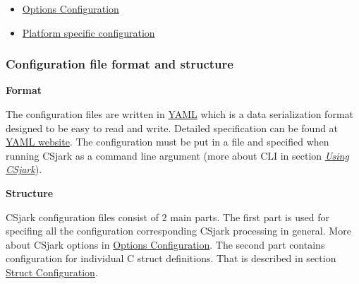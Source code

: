 \documentclass[A4paper,10pt,english]{sphinxmanual}
\begin{document}
{\begin{minipage}{0.95\linewidth}
\begin{itemize}
\begin{itemize}
\begin{itemize}
\begin{itemize}
\end{itemize}

\item {} 
{\hyperref[user/config:trailers]{Trailers}}

\item {} 
{\hyperref[user/config:custom-handling-of-data-types]{Custom handling of data types}}

\item {} 
{\hyperref[user/config:unknown-structs-handling]{Unknown structs handling}}

\end{itemize}

\item {} 
{\hyperref[user/config:options-configuration]{Options Configuration}}

\item {} 
{\hyperref[user/config:platform-specific-configuration]{Platform specific configuration}}

\end{itemize}

\end{itemize}
\end{minipage}}
\begin{center}\setlength{\fboxsep}{5pt}\end{center}


\subsubsection{Configuration file format and structure}
\label{user/config:configuration-file-format-and-structure}
\textbf{Format}

The configuration files are written in \href{http://www.yaml.org/}{YAML} which is a data serialization format designed to be easy to read and write. Detailed specification can be found at \href{http://www.yaml.org/spec/1.2/spec.html}{YAML website}. The configuration must be put in a  file and specified when running CSjark as a command line argument (more about CLI in section {\hyperref[user/use:use]{\emph{Using CSjark}}}).

\textbf{Structure}

CSjark configuration files consist of 2 main parts. The first part is used for specifing all the configuration corresponding CSjark processing in general. More about CSjark options in {\hyperref[user/config:options-configuration]{Options Configuration}}. The second part contains configuration for individual C struct definitions. That is described in section {\hyperref[user/config:struct-configuration]{Struct Configuration}}.
\end{document}
